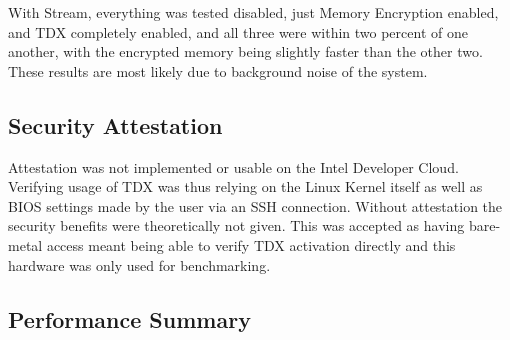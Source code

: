 With Stream, everything was tested disabled, just Memory Encryption enabled, and TDX completely enabled, and all three were within two percent of one another, with the encrypted memory being slightly faster than the other two. These results are most likely due to background noise of the system.

\begin{table}[]
    \centering
    \caption{Comparison of Memory Access speed using STREAM for various Non-VM settings as well as legacy VMs and TD}
\end{table}



\subsection{Security Attestation}

Attestation was not implemented or usable on the Intel Developer Cloud. Verifying usage of TDX was thus relying on the Linux Kernel itself as well as BIOS settings made by the user via an SSH connection. Without attestation the security benefits were theoretically not given. This was accepted as having bare-metal access meant being able to verify TDX activation directly and this hardware was only used for benchmarking.


\subsection{Performance Summary}
\label{Perf_EVal}

